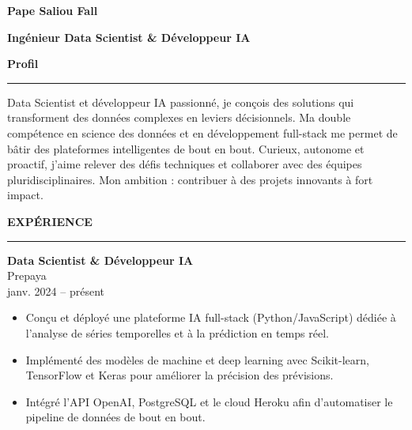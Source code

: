 \documentclass{article}
\newcommand{\cvsection}[1]{%
  \par\bigskip                %
  {\bfseries\Large #1}\par
  \noindent\rule{\linewidth}{0.8pt}\par
  \medskip                    %
}
\newcommand*{\ClipSep}{0.4cm}
\begin{document}
\pagestyle{empty}
\begin{paracol}{2}

\begin{minipage}{0.7\linewidth}
{\LARGE\textbf{Pape Saliou Fall}}

\bigskip
{\large\textbf{Ingénieur Data Scientist \& Développeur IA}}
\end{minipage}\hfill
\begin{minipage}{0.18\linewidth}
\end{minipage}

\cvsection{Profil}
Data Scientist et développeur IA passionné, je conçois des solutions qui transforment des données complexes en leviers décisionnels. Ma double compétence en science des données et en développement full-stack me permet de bâtir des plateformes intelligentes de bout en bout. Curieux, autonome et proactif, j’aime relever des défis techniques et collaborer avec des équipes pluridisciplinaires. Mon ambition : contribuer à des projets innovants à fort impact.

\cvsection{EXPÉRIENCE}

\colorbox{maincolor}{%
  \begin{minipage}{\linewidth}
    \textbf{Data Scientist \& Développeur IA} \\ Prepaya \\ janv. 2024 – présent
    \begin{itemize}
      \item Conçu et déployé une plateforme IA full-stack (Python/JavaScript) dédiée à l’analyse de séries temporelles et à la prédiction en temps réel. \item Implémenté des modèles de machine et deep learning avec Scikit-learn, TensorFlow et Keras pour améliorer la précision des prévisions. \item Intégré l’API OpenAI, PostgreSQL et le cloud Heroku afin d’automatiser le pipeline de données de bout en bout.
    \end{itemize}
  \end{minipage}}


\end{paracol}
\end{document}
